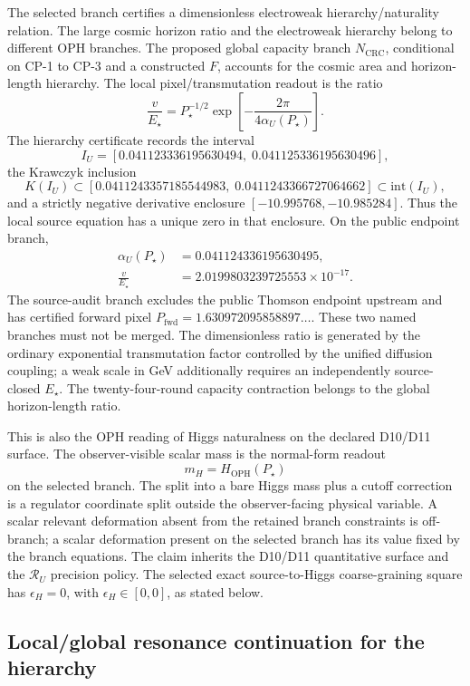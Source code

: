 \documentclass[11pt]{article}
\begin{document}
The selected branch certifies a dimensionless electroweak
hierarchy/naturality relation. The large
cosmic horizon ratio and the electroweak hierarchy belong to different OPH branches.
The proposed global capacity branch \(N_{\mathrm{CRC}}\), conditional on CP-1 to CP-3 and a
constructed \(F\), accounts for the cosmic area and horizon-length
hierarchy. The local pixel/transmutation readout is the ratio
\[
\frac{v}{E_\star}
=
P_\star^{-1/2}
\exp\!\left[-\frac{2\pi}{4\alpha_U(P_\star)}\right].
\]
The hierarchy certificate records the interval
\[
I_U=[0.041123336195630494,\;0.041125336195630496],
\]
the Krawczyk inclusion
\[
K(I_U)\subset
[0.0411243357185544983,\;0.0411243366727064662]
\subset \mathrm{int}(I_U),
\]
and a strictly negative derivative enclosure
\([-10.995768,-10.985284]\).  Thus the local source equation has a unique zero in
that enclosure.  On the public endpoint branch,
\[
\begin{aligned}
\alpha_U(P_\star)&=0.041124336195630495,\\
\frac{v}{E_\star}&=2.0199803239725553\times10^{-17}.
\end{aligned}
\]
The source-audit branch excludes the public Thomson endpoint upstream and has certified forward
pixel \(P_{\mathrm{fwd}}=1.630972095858897\ldots\). These two named branches
must not be merged.  The dimensionless ratio is generated by the ordinary
exponential transmutation factor controlled by the unified diffusion coupling;
a weak scale in GeV additionally requires an independently source-closed
\(E_\star\). The
twenty-four-round capacity contraction belongs to the global horizon-length ratio.

This is also the OPH reading of Higgs naturalness on the declared D10/D11 surface. The
observer-visible scalar mass is the normal-form readout
\[
m_H=H_{\mathrm{OPH}}(P_\star)
\]
on the selected branch. The split into a bare Higgs mass plus a cutoff correction is a regulator
coordinate split outside the observer-facing physical variable. A scalar relevant deformation absent
from the retained branch constraints is off-branch; a scalar deformation present on the selected
branch has its value fixed by the branch equations. The claim inherits the D10/D11 quantitative
surface and the \(\mathcal R_U\) precision policy. The selected exact source-to-Higgs
coarse-graining square has \(\epsilon_H=0\), with
\(\epsilon_H\in[0,0]\), as stated below.

\subsection{Local/global resonance continuation for the hierarchy}
\end{document}

